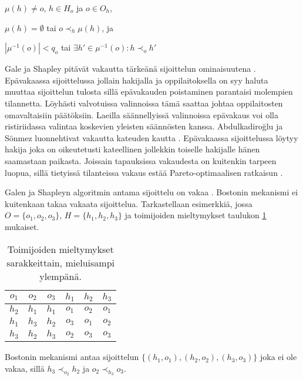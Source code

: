 \documentclass[gradu, twoside]{tktltiki}
\begin{document}
\begin{itemize*}
  \item $\mu(h) \neq o$, $h \in H_o$ ja $o \in O_h$,
  \item $\mu(h) = \emptyset$ tai $o \prec_h \mu(h)$, ja
  \item $|\mu^{-1}(o)| < q_o$ tai $\exists h' \in \mu^{-1}(o): h
    \prec_o h'$
\end{itemize*}

Gale ja Shapley pitävät vakautta tärkeänä sijoittelun ominaisuutena
\cite{galeshapley62}. Epävakaassa sijoittelussa jollain hakijalla ja
oppilaitoksella on syy haluta muuttaa sijoittelun tulosta sillä
epävakauden poistaminen parantaisi molempien tilannetta. Löyhästi
valvotuissa valinnoissa tämä saattaa johtaa oppilaitosten
omavaltaisiin päätöksiin. Laeilla säännellyissä valinnoissa epävakaus
voi olla ristiriidassa valintaa koskevien yleisten säännösten kanssa.
Abdulkadiroğlu ja Sönmez luonnehtivat vakautta kateuden kautta
\cite{abdusön03}. Epävakaassa sijoittelussa löytyy hakija joka on
oikeutetusti kateellinen jollekkin toiselle hakijalle hänen saamastaan
paikasta. Joissain tapauksissa vakaudesta on kuitenkin tarpeen luopua,
sillä tietyissä tilanteissa vakaus estää Pareto-optimaalisen ratkaisun
\cite{ergin02}.

Galen ja Shapleyn algoritmin antama sijoittelu on vakaa
\cite{galeshapley62, gusfield89}. Bostonin mekanismi ei kuitenkaan
takaa vakaata sijoittelua. Tarkastellaan esimerkkiä, jossa $O = \{o_1,
o_2, o_3\}$, $H = \{h_1, h_2, h_3\}$ ja toimijoiden mieltymykset
taulukon \ref{boston_vakaus} mukaiset.

\begin{table}[h]
  \begin{center}
    \begin{tabular}{ c c c | c c c }
    $o_1$ & $o_2$ & $o_3$ & $h_1$ & $h_2$ & $h_3$ \\
    \hline
    $h_2$ & $h_1$ & $h_1$ & $o_1$ & $o_2$ & $o_1$ \\
    $h_1$ & $h_3$ & $h_2$ & $o_3$ & $o_1$ & $o_2$ \\
    $h_3$ & $h_2$ & $h_3$ & $o_2$ & $o_3$ & $o_3$
    \end{tabular}
    \caption{Toimijoiden mieltymykset sarakkeittain, mieluisampi ylempänä.}
    \label{boston_vakaus}
  \end{center}
\end{table}

Bostonin mekanismi antaa sijoittelun $\{(h_1, o_1), (h_2, o_2), (h_3,
o_3)\}$ joka ei ole vakaa, sillä $h_3 \prec_{o_2} h_2$ ja $o_2
\prec_{h_3} o_3$.
\end{document}
